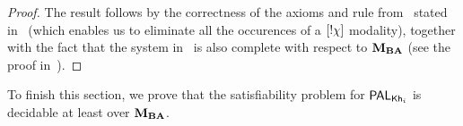 \begin{proof}
The result follows by the correctness of the axioms and rule from~ stated in~ (which enables us to eliminate all the occurences of a $[!\chi]$ modality), together with the fact that the system in~ is also complete with respect to $\mathbf{M}_{\mathbf{BA}}$ (see the proof in~\cite{AFSVQ21,AFSVQ23report}).
\end{proof}



To finish this section, we prove that the satisfiability problem for $\mathsf{PAL}_{{\sf Kh}_i}$ is decidable at least over $\mathbf{M}_{\mathbf{BA}}$.

\medskip 

